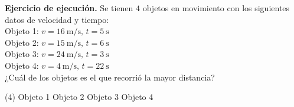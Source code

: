 \documentclass[12pt, letter]{exam}
\begin{document}
\begin{questions}
    \question \label{Ejercicio_02} \textbf{Ejercicio de ejecución. } Se tienen $4$ objetos en movimiento con los siguientes datos de velocidad y tiempo: \\[0.3em]
    Objeto 1: $v = \SI{16}{\meter\per\second}, \, t = \SI{5}{\second}$ \\[0.3em]
    Objeto 2: $v = \SI{15}{\meter\per\second}, \, t = \SI{6}{\second}$ \\[0.3em]
    Objeto 3: $v = \SI{24}{\meter\per\second}, \, t = \SI{3}{\second}$ \\[0.3em]
    Objeto 4: $v = \SI{4}{\meter\per\second}, \, t = \SI{22}{\second}$ \\[0.3em]
    ¿Cuál de los objetos es el que recorrió la mayor distancia? 
    \begin{tasks}(4)
        \task Objeto 1
        \task Objeto 2
        \task Objeto 3
        \task Objeto 4        
    \end{tasks}

\end{questions}
\end{document}
